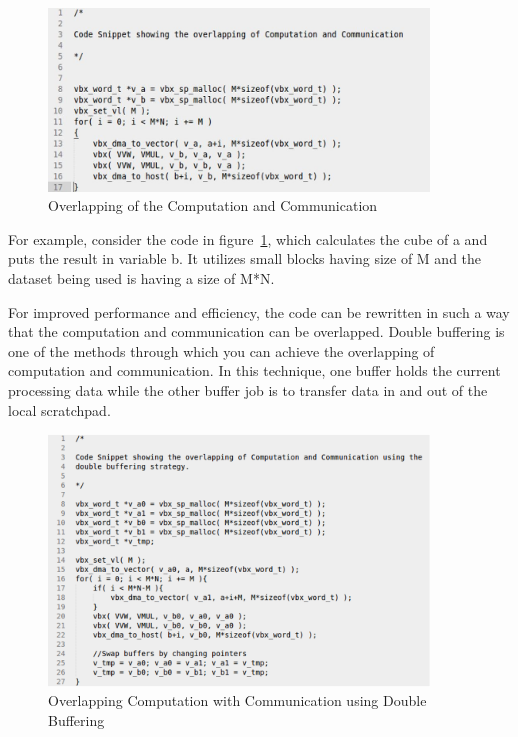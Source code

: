 \begin{figure}
	\centering
	\includegraphics[width=0.9\textwidth]{images/c1.png}
	\caption{Overlapping of the Computation and Communication}
	\label{c1:mat}
\end{figure}

For example, consider the code in figure~\ref{c1:mat}, which calculates the cube of a and puts the result in variable b. It utilizes small blocks having size of M and the dataset being used is having a size of M*N.

For improved performance and efficiency, the code can be rewritten in such a way that the computation and communication can be overlapped. Double buffering is one of the methods through which you can achieve the overlapping of computation and communication. In this technique, one buffer holds the current processing data while the other buffer job is to transfer data in and out of the local scratchpad.

\begin{figure}
	\centering
	\includegraphics[width=0.9\textwidth]{images/c2.png}
	\caption{Overlapping Computation with Communication using Double Buffering                   
	}
	\label{c2:mat}
\end{figure}

